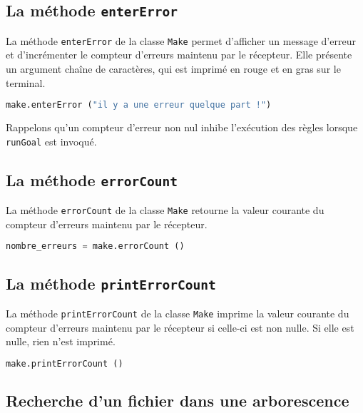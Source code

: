 \documentclass[a4paper,11pt]{extarticle}
\begin{document}
\subsection{La méthode \texttt{enterError}}

La méthode \texttt{enterError} de la classe \texttt{Make} permet d'afficher un message d'erreur et d'incrémenter le compteur d'erreurs maintenu par le récepteur. Elle présente un argument chaîne de caractères, qui est imprimé en rouge et en gras sur le terminal.
\begin{lstlisting}[language=py]
make.enterError ("il y a une erreur quelque part !")
\end{lstlisting}
Rappelons qu'un compteur d'erreur non nul inhibe l'exécution des règles lorsque \texttt{runGoal} est invoqué.


\subsection{La méthode \texttt{errorCount}}

La méthode \texttt{errorCount} de la classe \texttt{Make} retourne la valeur courante du compteur d'erreurs maintenu par le récepteur.
\begin{lstlisting}[language=py]
nombre_erreurs = make.errorCount ()
\end{lstlisting}


\subsection{La méthode \texttt{printErrorCount}}

La méthode \texttt{printErrorCount} de la classe \texttt{Make} imprime la valeur courante du compteur d'erreurs maintenu par le récepteur si celle-ci est non nulle. Si elle est nulle, rien n'est imprimé.
\begin{lstlisting}[language=py]
make.printErrorCount ()
\end{lstlisting}


\subsection{Recherche d'un fichier dans une arborescence}
\end{document}
